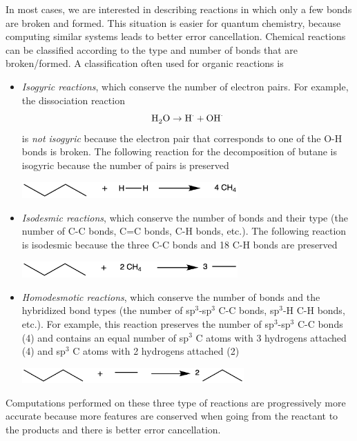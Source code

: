 \documentclass[../Main/chem371-notes.tex]{subfiles}
\begin{document}
In most cases, we are interested in describing reactions in which only a few bonds are broken and formed.
This situation is easier for quantum chemistry, because computing similar systems leads to better error cancellation.
Chemical reactions can be classified according to the type and number of bonds that are broken/formed.
A classification often used for organic reactions is
\begin{itemize}
\item \emph{Isogyric reactions}, which conserve the number of electron pairs.
For example, the dissociation reaction
\begin{equation}
\ce{H2O} \rightarrow \ce{H}^\cdot + \ce{OH}^\cdot
\end{equation}
is \emph{not isogyric} because the electron pair that corresponds to one of the O-H bonds is broken.
The following reaction for the decomposition of butane is isogyric because the number of pairs is preserved

\begin{center}
\includegraphics[width=3.25in]{img/isogyric.png}
\end{center}

\item \emph{Isodesmic reactions}, which conserve the number of bonds and their type (the number of C-C bonds, C=C bonds, C-H bonds, etc.).
The following reaction is isodesmic because the three C-C bonds and 18 C-H bonds are preserved

\begin{center}
\includegraphics[width=3.25in]{img/isodesmic.png}
\end{center}

\item \emph{Homodesmotic reactions}, which conserve the number of bonds and the hybridized bond types (the number of sp$^3$-sp$^3$ C-C bonds, sp$^3$-H C-H bonds, etc.).
For example, this reaction preserves the number of sp$^3$-sp$^3$ C-C bonds (4) and contains an equal number of sp$^3$ C atoms with 3 hydrogens attached (4) and sp$^3$ C atoms with 2 hydrogens attached (2)

\begin{center}
\includegraphics[width=3.35in]{img/homodesmotic.png}
\end{center}

\end{itemize}
Computations performed on these three type of reactions are progressively more accurate because more features are conserved when going from the reactant to the products and there is better error cancellation.
\end{document}
